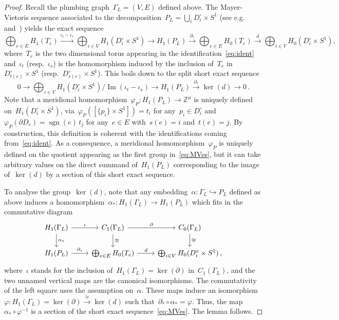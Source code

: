 \documentclass[10.9pt,a4paper]{amsart}
\theoremstyle{definition}
\theoremstyle{remark}
\newcommand{\Z}{\mathbb{Z}}
\newcommand{\sgn}{\operatorname{sgn}}
\begin{document}
\begin{proof}
Recall the plumbing graph~$\Gamma_L=(V,E)$ defined above. The Mayer-Vietoris sequence associated to the decomposition~$P_L=\bigcup_i D_i^\circ \times S^1$ (see e.g.~\cite[Lemma~3.3]{BFP} and~\cite[Lemma~4.7]{ConwayNagelToffoli}) yields the exact sequence 
\[
\bigoplus_{e\in E} H_1(T_e) \stackrel{\iota_t-\iota_s}{\longrightarrow} \bigoplus_{i\in V} H_1(D_i^\circ\times S^1) \longrightarrow H_1(P_L) \stackrel{\partial_*}{\longrightarrow} \bigoplus_{e\in E} H_0(T_e) \stackrel{d}{\longrightarrow} \bigoplus_{i\in V} H_0(D_i^\circ \times S^1),
\]
where~$T_e$ is the two dimensional torus appearing in the identification~\eqref{eq:ident} and~$\iota_t$ (resp.~$\iota_s$) is the homomorphism induced by the inclusion of~$T_e$ in~$D^\circ_{t(e)}\times S^1$ (resp.~$D^\circ_{s(e)}\times S^1$). This boils down to the split short exact sequence
\begin{equation}
\label{eq:MVes}
0 \longrightarrow \bigoplus_{i\in V} H_1(D_i^\circ\times S^1)/\operatorname{Im}(\iota_t-\iota_s)\longrightarrow H_1(P_L) \stackrel{\partial_*}{\longrightarrow} \ker(d)\longrightarrow 0\,.
\end{equation}
Note that a meridional homomorphism~$\varphi_P\colon H_1(P_L)\to \Z^\mu$ is uniquely defined
on~$H_1(D_i^\circ\times S^1)$, via~$\varphi_P([\{p_i\}\times S^1])=t_i$ for any~$p_i\in D^\circ_i$ and~$\varphi_P(\partial D_e)=\sgn(e)\, t_j$ for any~$e\in E$ with~$s(e)=i$ and~$t(e)=j$. 
By construction, this definition is coherent with the identifications coming from~\eqref{eq:ident}.
As a consequence, a meridional homomorphism~$\varphi_P$ 
is uniquely defined on the quotient appearing as the first group in~\eqref{eq:MVes}, but it can take arbitrary values
on the direct summand of~$H_1(P_L)$ corresponding to the image of~$\ker(d)$ by a section of this short
exact sequence.

To analyse the group~$\ker(d)$, note that any embedding~$\alpha\colon\Gamma_L\hookrightarrow P_L$ defined as above induces
a homomorphism~$\alpha_*\colon H_1(\Gamma_L)\to H_1(P_L)$ which fits in the commutative diagram
\[
\begin{tikzcd}
H_1(\Gamma_L)\arrow{r}{\iota} \arrow{d}{\alpha_*} & C_1(\Gamma_L) \arrow{r}{\partial} \arrow{d}{\cong}& C_0(\Gamma_L)\arrow{d}{\cong}\\
H_1(P_L)\arrow{r}{\partial_*}&\bigoplus_{e\in E} H_0(T_e) \arrow{r}{d} & \bigoplus_{i\in V} H_0(D^\circ_i \times S^1)\,,
\end{tikzcd}
\]
where~$\iota$ stands for the inclusion of~$H_1(\Gamma_L)=\ker(\partial)$ in~$C_1(\Gamma_L)$,
and the two unnamed vertical maps are the canonical isomorphisms. 
The commutativity of the left square uses the assumption on~$\alpha$.
These maps induce an isomorphism~$\varphi\colon H_1(\Gamma_L)=\ker(\partial)\stackrel{\cong}{\to}\ker(d)$ such that~$\partial_*\circ\alpha_*=\varphi$.
Thus, the map~$\alpha_*\circ\varphi^{-1}$ is a section of the short exact sequence~\eqref{eq:MVes}.
The lemma follows.
\end{proof}
\end{document}
